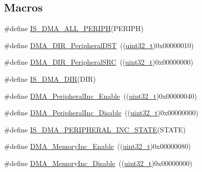 \subsection*{Macros}
\begin{DoxyCompactItemize}
\item 
\#define \hyperlink{group___d_m_a___exported___constants_gabcab9fa1c48b148703a8f41c1d99e0c8}{I\+S\+\_\+\+D\+M\+A\+\_\+\+A\+L\+L\+\_\+\+P\+E\+R\+I\+PH}(P\+E\+R\+I\+PH)
\item 
\#define \hyperlink{group___d_m_a__data__transfer__direction_ga51567b748ddac277743c65c20275971a}{D\+M\+A\+\_\+\+D\+I\+R\+\_\+\+Peripheral\+D\+ST}~((\hyperlink{_p_e___types_8h_a33594304e786b158f3fb30289278f5af}{uint32\+\_\+t})0x00000010)
\item 
\#define \hyperlink{group___d_m_a__data__transfer__direction_ga5ce120a044359410136695a2c05df68e}{D\+M\+A\+\_\+\+D\+I\+R\+\_\+\+Peripheral\+S\+RC}~((\hyperlink{_p_e___types_8h_a33594304e786b158f3fb30289278f5af}{uint32\+\_\+t})0x00000000)
\item 
\#define \hyperlink{group___d_m_a__data__transfer__direction_gaaad13d2b5808e32a35a2d21bcdbb2296}{I\+S\+\_\+\+D\+M\+A\+\_\+\+D\+IR}(D\+IR)
\item 
\#define \hyperlink{group___d_m_a__peripheral__incremented__mode_gaf7921ea423fb60701a091c508cd0f33a}{D\+M\+A\+\_\+\+Peripheral\+Inc\+\_\+\+Enable}~((\hyperlink{_p_e___types_8h_a33594304e786b158f3fb30289278f5af}{uint32\+\_\+t})0x00000040)
\item 
\#define \hyperlink{group___d_m_a__peripheral__incremented__mode_ga0fe3ff9c67bec802dd239fd17c3dbd31}{D\+M\+A\+\_\+\+Peripheral\+Inc\+\_\+\+Disable}~((\hyperlink{_p_e___types_8h_a33594304e786b158f3fb30289278f5af}{uint32\+\_\+t})0x00000000)
\item 
\#define \hyperlink{group___d_m_a__peripheral__incremented__mode_ga28762105b3f567c16ba79a47e68ff0fa}{I\+S\+\_\+\+D\+M\+A\+\_\+\+P\+E\+R\+I\+P\+H\+E\+R\+A\+L\+\_\+\+I\+N\+C\+\_\+\+S\+T\+A\+TE}(S\+T\+A\+TE)
\item 
\#define \hyperlink{group___d_m_a__memory__incremented__mode_ga4e8cb23d039c74bbbf365d7678835bbb}{D\+M\+A\+\_\+\+Memory\+Inc\+\_\+\+Enable}~((\hyperlink{_p_e___types_8h_a33594304e786b158f3fb30289278f5af}{uint32\+\_\+t})0x00000080)
\item 
\#define \hyperlink{group___d_m_a__memory__incremented__mode_ga795a277c997048783a383b026f19a5ab}{D\+M\+A\+\_\+\+Memory\+Inc\+\_\+\+Disable}~((\hyperlink{_p_e___types_8h_a33594304e786b158f3fb30289278f5af}{uint32\+\_\+t})0x00000000)
\item 

\end{DoxyCompactItemize}
